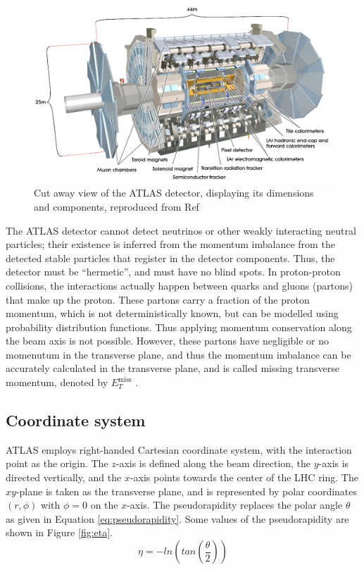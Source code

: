 \documentclass[12pt,a4paper,openright,twoside]{report}
\newcommand{\met}{$E_T^{\mathrm{miss}}$ }
\newcommand{\myequations}[1]{%
\addcontentsline{equ}{myequations}{\protect\numberline{\theequation}#1}\par}
\begin{document}
\begin{figure}[h]
\centering
\includegraphics[width=\textwidth]{ATLAS.png}
\caption{Cut away view of the ATLAS detector, displaying its dimensions and components, reproduced from Ref \cite{ATLAS_detector}}
\label{fig:ATLAS}
\end{figure}

The ATLAS detector cannot detect neutrinos or other weakly interacting neutral particles; their existence is inferred from the momentum imbalance from the detected stable particles that register in the detector components. Thus, the detector must be ``hermetic'', and must have no blind spots. In proton-proton collisions, the interactions actually happen between quarks and gluons (partons) that make up the proton. These partons carry a fraction of the proton momentum, which is not deterministically known, but can be modelled using probability distribution functions. Thus applying momentum conservation along the beam axis is not possible. However, these partons have negligible or no momenutum in the transverse plane, and thus the momentum imbalance can be accurately calculated in the transverse plane, and is called missing transverse momentum, denoted by \met.

\subsection{Coordinate system}
ATLAS employs right-handed Cartesian coordinate system, with the interaction point as the origin. The $z$-axis is defined along the beam direction, the $y$-axis is directed vertically, and the $x$-axis points towards the center of the LHC ring. The $xy$-plane is taken as the transverse plane, and is represented by polar coordinates $(r,\phi)$ with $\phi=0$ on the $x$-axis. The pseudorapidity replaces the polar angle $\theta$ as given in Equation \ref{eq:pseudorapidity}. Some values of the pseudorapidity are shown in Figure \ref{fig:eta}.
\begin{equation}
\eta = -ln\left(tan\left(\frac{\theta}{2}\right)\right)
\label{eq:pseudorapidity}
\end{equation}
\myequations{Pseudorapidity $\eta$}
\end{document}
